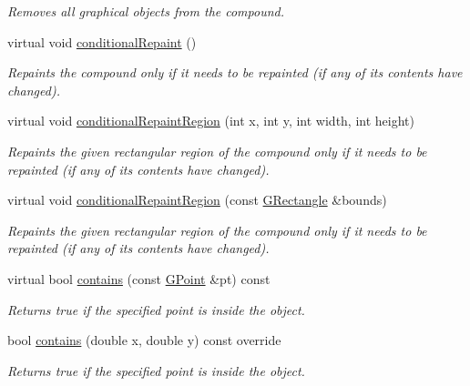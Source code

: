 \begin{DoxyCompactItemize}
\begin{DoxyCompactList}\small\item\em Removes all graphical objects from the compound. \end{DoxyCompactList}\item 
virtual void \mbox{\hyperlink{classsgl_1_1GCompound_a221b3e75bb3d9d0bfea62b3364e6773b}{conditional\+Repaint}} ()
\begin{DoxyCompactList}\small\item\em Repaints the compound only if it needs to be repainted (if any of its contents have changed). \end{DoxyCompactList}\item 
virtual void \mbox{\hyperlink{classsgl_1_1GCompound_aedd4b792311d946eeaf44b0de337a408}{conditional\+Repaint\+Region}} (int x, int y, int width, int height)
\begin{DoxyCompactList}\small\item\em Repaints the given rectangular region of the compound only if it needs to be repainted (if any of its contents have changed). \end{DoxyCompactList}\item 
virtual void \mbox{\hyperlink{classsgl_1_1GCompound_a3932a12278752db368e24fa404e446aa}{conditional\+Repaint\+Region}} (const \mbox{\hyperlink{structsgl_1_1GRectangle}{G\+Rectangle}} \&bounds)
\begin{DoxyCompactList}\small\item\em Repaints the given rectangular region of the compound only if it needs to be repainted (if any of its contents have changed). \end{DoxyCompactList}\item 
virtual bool \mbox{\hyperlink{classsgl_1_1GObject_a1dbc9dafaae51958112dbe1267a1f547}{contains}} (const \mbox{\hyperlink{structsgl_1_1GPoint}{G\+Point}} \&pt) const
\begin{DoxyCompactList}\small\item\em Returns {\ttfamily true} if the specified point is inside the object. \end{DoxyCompactList}\item 
bool \mbox{\hyperlink{classsgl_1_1GCompound_ad973a1d55799d3a73bf8b04986cd804e}{contains}} (double x, double y) const override
\begin{DoxyCompactList}\small\item\em Returns {\ttfamily true} if the specified point is inside the object. \end{DoxyCompactList}\item 

\end{DoxyCompactItemize}
